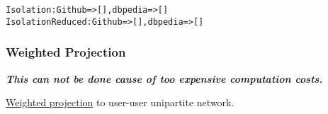 \documentclass[letterpaper,10pt,english]{/usr/local/lib/python2.7/dist-packages/sphinx/texinputs/sphinxhowto}
\newenvironment{InvisibleVerbatim}
        {\begin{mdframed}[leftmargin=0.1\linewidth,innerleftmargin=3pt,innerrightmargin=3pt, userdefinedwidth=1\linewidth, linewidth=0pt, linecolor=white, usetwoside=false]}
        {\end{mdframed}}
\begin{document}
    

        
        

            
                \begin{InvisibleVerbatim}
                \vspace{-0.5\baselineskip}
\begin{alltt}Isolation: Github => [], dbpedia => []
Isolation Reduced: Github => [], dbpedia => []
\end{alltt}

            \end{InvisibleVerbatim}
            
        
    
\subsubsection{Weighted Projection}

\textbf{\emph{This can not be done cause of too expensive computation
costs.}}

\href{http://networkx.lanl.gov/reference/generated/networkx.algorithms.centrality.degree_centrality.html\#networkx.algorithms.centrality.degree_centrality}{Weighted
projection} to user-user unipartite network.

\end{document}
